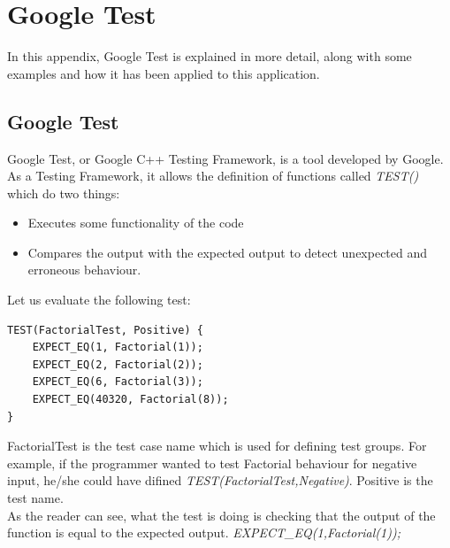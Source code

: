 
\chapter{Google Test} %

\label{AppendixC} %

In this appendix, Google Test is explained in more detail, along with some examples and how it has been applied to this application.

\section{Google Test}
Google Test, or Google C++ Testing Framework, is a tool developed by Google. As a Testing Framework, it allows the definition of functions called \emph{TEST()} which do two things:
\begin{itemize}
	\item Executes some functionality of the code
	\item Compares the output with the expected output to detect unexpected and erroneous behaviour.
\end{itemize}

Let us evaluate the following test:
\begin{verbatim}
TEST(FactorialTest, Positive) {
    EXPECT_EQ(1, Factorial(1));
    EXPECT_EQ(2, Factorial(2));
    EXPECT_EQ(6, Factorial(3));
    EXPECT_EQ(40320, Factorial(8));
}
\end{verbatim}
FactorialTest is the test case name which is used for defining test groups. For example, if the programmer wanted to test Factorial behaviour for negative input, he/she could have difined \emph{TEST(FactorialTest,Negative)}. Positive is the test name.\\
As the reader can see, what the test is doing is checking that the output of the function is equal to the expected output. \emph{EXPECT\_EQ(1,Factorial(1));}

